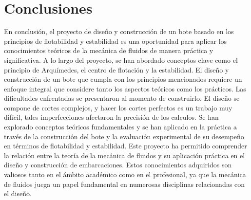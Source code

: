 \documentclass[letterpaper]{article}
\begin{document}
\section{Conclusiones}
En conclusión, el proyecto de diseño y construcción de un bote basado en los principios de flotabilidad y estabilidad es una oportunidad para aplicar los conocimientos teóricos de la mecánica de fluidos de manera práctica y significativa. A lo largo del proyecto, se han abordado conceptos clave como el principio de Arquímedes, el centro de flotación y la estabilidad.
El diseño y construcción de un bote que cumpla con los principios mencionados requiere un enfoque integral que considere tanto los aspectos teóricos como los prácticos. Las dificultades enfrentadas se presentaron al momento de construirlo. El diseño se compone de cortes complejos, y hacer los cortes perfectos es un trabajo muy difícil, tales imperfecciones afectaron la precisión de los calculos. Se han explorado conceptos teóricos fundamentales y se han aplicado en la práctica a través de la construcción del bote y la evaluación experimental de su desempeño en términos de flotabilidad y estabilidad.
Este proyecto ha permitido comprender la relación entre la teoría de la mecánica de fluidos y su aplicación práctica en el diseño y construcción de embarcaciones. Estos conocimientos adquiridos son valiosos tanto en el ámbito académico como en el profesional, ya que la mecánica de fluidos juega un papel fundamental en numerosas disciplinas relacionadas con el diseño.


\newpage
\section*{}

\nocite{*}

\end{document}
